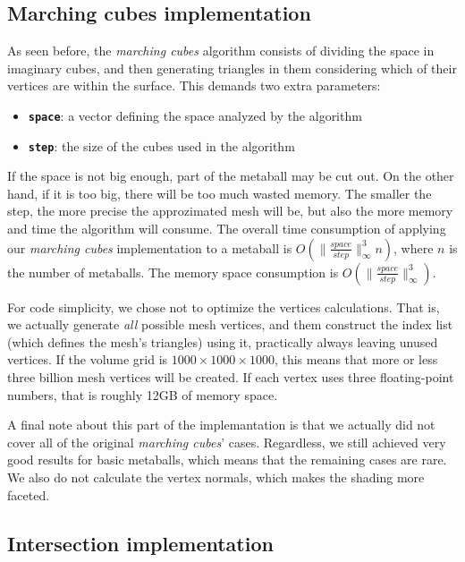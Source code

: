 \documentclass[conference]{acmsiggraph}
\begin{document}
\subsection{Marching cubes implementation}

As seen before, the \textit{marching cubes} algorithm consists of dividing the
space in imaginary cubes, and then generating triangles in them considering
which of their vertices are within the surface. This demands two extra
parameters:

\begin{itemize}
  \item \textbf{\texttt{space}}: a vector defining the space analyzed by the algorithm
  \item \textbf{\texttt{step}}: the size of the cubes used in the algorithm
\end{itemize}

If the space is not big enough, part of the metaball may be cut out. On the
other hand, if it is too big, there will be too much wasted memory. The smaller
the step, the more precise the approzimated mesh will be, but also the more
memory and time the algorithm will consume. The overall time consumption of
applying our \textit{marching cubes} implementation to a metaball is
$O(\|\frac{space}{step}\|_\infty^3 n)$, where $n$ is the number of metaballs.
The memory space consumption is $O(\|\frac{space}{step}\|_\infty^3)$.

For code simplicity, we chose not to optimize the vertices calculations. That
is, we actually generate \textit{all} possible mesh vertices, and them construct
the index list (which defines the mesh's triangles) using it, practically always
leaving unused vertices. If the volume grid is $1000 \times 1000 \times 1000$,
this means that more or less three billion mesh vertices will be created. If
each vertex uses three floating-point numbers, that is roughly 12GB of memory
space.

A final note about this part of the implemantation is that we actually did not
cover all of the original \textit{marching cubes}' cases. Regardless, we still
achieved very good results for basic metaballs, which means that the remaining
cases are rare. We also do not calculate the vertex normals, which makes the
shading more faceted.

\subsection{Intersection implementation}
\end{document}
